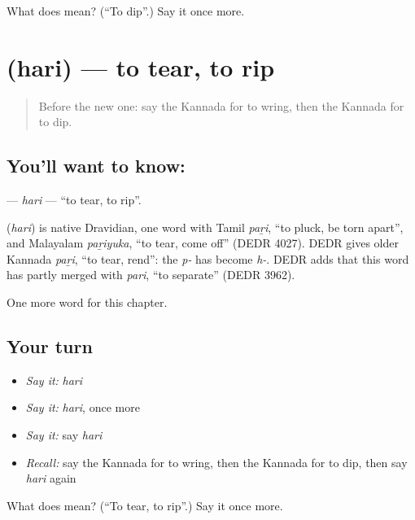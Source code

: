 \begin{tcolorbox}[breakable,colback=teal!4,colframe=teal!35!black,title={Before you move on}]
What does  mean? (\textquotedblleft{}To dip\textquotedblright{}.) Say it once more.
\end{tcolorbox}
\section[\texorpdfstring{\kn{ಹರಿ} (hari)}{ಹರಿ (hari)}]{ (hari) — to tear, to rip}

\label{lesson:KA-C242-hari}



\begin{quote}
Before the new one: say the Kannada for to wring, then the Kannada for to dip.
\end{quote}

\subsection*{You'll want to know: }
\textbf{} — \emph{hari} — \textquotedblleft{}to tear, to rip\textquotedblright{}.

\begin{cousinweb}
\textbf{} (\emph{hari}) is native Dravidian, one word with Tamil \emph{paṟi}, \textquotedblleft{}to pluck, be torn apart\textquotedblright{}, and Malayalam \emph{paṟiyuka}, \textquotedblleft{}to tear, come off\textquotedblright{} (DEDR 4027). DEDR gives older Kannada \emph{paṟi}, \textquotedblleft{}to tear, rend\textquotedblright{}: the \emph{p-} has become \emph{h-}. DEDR adds that this word has partly merged with \emph{pari}, \textquotedblleft{}to separate\textquotedblright{} (DEDR 3962).
\end{cousinweb}

\begin{grammarlens}[title={What you've built}]
One more word for this chapter.
\end{grammarlens}

\subsection*{Your turn}
\begin{itemize}
\raggedright
  \item \emph{Say it:} \emph{hari}
  \item \emph{Say it:} \emph{hari}, once more
  \item \emph{Say it:} say \emph{hari}
  \item \emph{Recall:} say the Kannada for to wring, then the Kannada for to dip, then say \emph{hari} again
\end{itemize}

\begin{tcolorbox}[breakable,colback=teal!4,colframe=teal!35!black,title={Before you move on}]
What does  mean? (\textquotedblleft{}To tear, to rip\textquotedblright{}.) Say it once more.
\end{tcolorbox}
